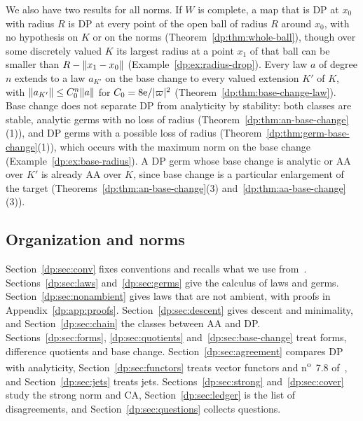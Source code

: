 We also have two results for all norms. If $W$ is complete, a map that is DP at $x_0$ with radius $R$ is DP at every point of the open ball of radius $R$ around $x_0$, with no hypothesis on $K$ or on the norms (Theorem~\ref{dp:thm:whole-ball}), though over some discretely valued $K$ its largest radius at a point $x_1$ of that ball can be smaller than $R-\lVert x_1-x_0\rVert$ (Example~\ref{dp:ex:radius-drop}). Every law $a$ of degree $n$ extends to a law $a_{K'}$ on the base change to every valued extension $K'$ of $K$, with $\lVert a_{K'}\rVert\le C_0^n\lVert a\rVert$ for $C_0=8\mathrm e/\lvert \varpi\rvert^2$ (Theorem~\ref{dp:thm:base-change-law}). Base change does not separate DP from analyticity by stability: both classes are stable, analytic germs with no loss of radius (Theorem~\ref{dp:thm:an-base-change}(1)), and DP germs with a possible loss of radius (Theorem~\ref{dp:thm:germ-base-change}(1)), which occurs with the maximum norm on the base change (Example~\ref{dp:ex:base-radius}). A DP germ whose base change is analytic or AA over $K'$ is already AA over $K$, since base change is a particular enlargement of the target (Theorems~\ref{dp:thm:an-base-change}(3) and~\ref{dp:thm:aa-base-change}(3)).

\subsection*{Organization and norms}

Section~\ref{dp:sec:conv} fixes conventions and recalls what we use from~\cite{I}. Sections~\ref{dp:sec:laws} and~\ref{dp:sec:germs} give the calculus of laws and germs. Section~\ref{dp:sec:nonambient} gives laws that are not ambient, with proofs in Appendix~\ref{dp:app:proofs}. Section~\ref{dp:sec:descent} gives descent and minimality, and Section~\ref{dp:sec:chain} the classes between AA and DP. Sections~\ref{dp:sec:forms}, \ref{dp:sec:quotients} and~\ref{dp:sec:base-change} treat forms, difference quotients and base change. Section~\ref{dp:sec:agreement} compares DP with analyticity, Section~\ref{dp:sec:functors} treats vector functors and n\textsuperscript{o}~7.8 of~\cite{Bou}, and Section~\ref{dp:sec:jets} treats jets. Sections~\ref{dp:sec:strong} and~\ref{dp:sec:cover} study the strong norm and CA, Section~\ref{dp:sec:ledger} is the list of disagreements, and Section~\ref{dp:sec:questions} collects questions.

